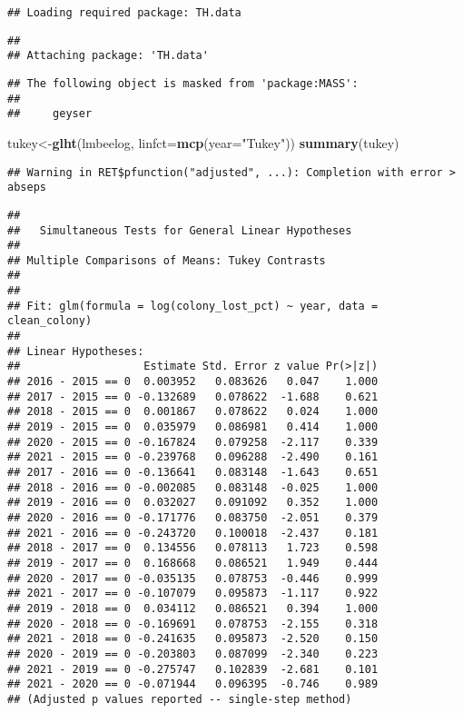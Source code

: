 \documentclass[
]{article}
\newenvironment{Shaded}{\begin{snugshade}}{\end{snugshade}}
\newcommand{\AttributeTok}[1]{\textcolor[rgb]{0.13,0.29,0.53}{#1}}
\newcommand{\FunctionTok}[1]{\textcolor[rgb]{0.13,0.29,0.53}{\textbf{#1}}}
\newcommand{\NormalTok}[1]{#1}
\newcommand{\OtherTok}[1]{\textcolor[rgb]{0.56,0.35,0.01}{#1}}
\newcommand{\StringTok}[1]{\textcolor[rgb]{0.31,0.60,0.02}{#1}}
\begin{document}
\begin{verbatim}
## Loading required package: TH.data
\end{verbatim}

\begin{verbatim}
## 
## Attaching package: 'TH.data'
\end{verbatim}

\begin{verbatim}
## The following object is masked from 'package:MASS':
## 
##     geyser
\end{verbatim}

\begin{Shaded}
\begin{Highlighting}[]
\NormalTok{tukey}\OtherTok{\textless{}{-}}\FunctionTok{glht}\NormalTok{(lmbeelog, }\AttributeTok{linfct=}\FunctionTok{mcp}\NormalTok{(}\AttributeTok{year=}\StringTok{"Tukey"}\NormalTok{))}
\FunctionTok{summary}\NormalTok{(tukey)}
\end{Highlighting}
\end{Shaded}

\begin{verbatim}
## Warning in RET$pfunction("adjusted", ...): Completion with error > abseps
\end{verbatim}

\begin{verbatim}
## 
##   Simultaneous Tests for General Linear Hypotheses
## 
## Multiple Comparisons of Means: Tukey Contrasts
## 
## 
## Fit: glm(formula = log(colony_lost_pct) ~ year, data = clean_colony)
## 
## Linear Hypotheses:
##                   Estimate Std. Error z value Pr(>|z|)
## 2016 - 2015 == 0  0.003952   0.083626   0.047    1.000
## 2017 - 2015 == 0 -0.132689   0.078622  -1.688    0.621
## 2018 - 2015 == 0  0.001867   0.078622   0.024    1.000
## 2019 - 2015 == 0  0.035979   0.086981   0.414    1.000
## 2020 - 2015 == 0 -0.167824   0.079258  -2.117    0.339
## 2021 - 2015 == 0 -0.239768   0.096288  -2.490    0.161
## 2017 - 2016 == 0 -0.136641   0.083148  -1.643    0.651
## 2018 - 2016 == 0 -0.002085   0.083148  -0.025    1.000
## 2019 - 2016 == 0  0.032027   0.091092   0.352    1.000
## 2020 - 2016 == 0 -0.171776   0.083750  -2.051    0.379
## 2021 - 2016 == 0 -0.243720   0.100018  -2.437    0.181
## 2018 - 2017 == 0  0.134556   0.078113   1.723    0.598
## 2019 - 2017 == 0  0.168668   0.086521   1.949    0.444
## 2020 - 2017 == 0 -0.035135   0.078753  -0.446    0.999
## 2021 - 2017 == 0 -0.107079   0.095873  -1.117    0.922
## 2019 - 2018 == 0  0.034112   0.086521   0.394    1.000
## 2020 - 2018 == 0 -0.169691   0.078753  -2.155    0.318
## 2021 - 2018 == 0 -0.241635   0.095873  -2.520    0.150
## 2020 - 2019 == 0 -0.203803   0.087099  -2.340    0.223
## 2021 - 2019 == 0 -0.275747   0.102839  -2.681    0.101
## 2021 - 2020 == 0 -0.071944   0.096395  -0.746    0.989
## (Adjusted p values reported -- single-step method)
\end{verbatim}
\end{document}
